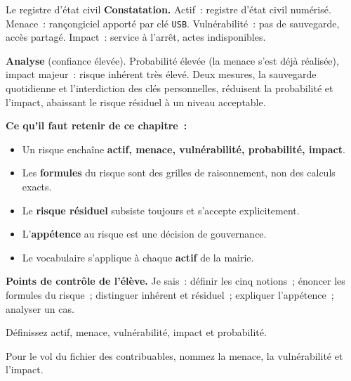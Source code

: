 \begin{boxobjet}{Le registre d'état civil}
\textbf{Constatation.} Actif~: registre d'état civil numérisé. Menace~:
rançongiciel apporté par clé \texttt{USB}. Vulnérabilité~: pas de sauvegarde,
accès partagé. Impact~: service à l'arrêt, actes indisponibles.

\medskip
\textbf{Analyse} (confiance élevée). Probabilité élevée (la menace s'est déjà
réalisée), impact majeur~: risque inhérent très élevé. Deux mesures,
la sauvegarde quotidienne et l'interdiction des clés personnelles, réduisent la
probabilité et l'impact, abaissant le risque résiduel à un niveau acceptable.
\end{boxobjet}

\separateur

\begin{boxresume}
\textbf{Ce qu'il faut retenir de ce chapitre~:}
\begin{itemize}
    \item Un risque enchaîne \textbf{actif, menace, vulnérabilité,
          probabilité, impact}.
    \item Les \textbf{formules} du risque sont des grilles de raisonnement, non
          des calculs exacts.
    \item Le \textbf{risque résiduel} subsiste toujours et s'accepte
          explicitement.
    \item L'\textbf{appétence} au risque est une décision de gouvernance.
    \item Le vocabulaire s'applique à chaque \textbf{actif} de la mairie.
\end{itemize}
\end{boxresume}

\begin{boxinfo}
\textbf{Points de contrôle de l'élève.} Je sais~: définir les cinq notions~;
énoncer les formules du risque~; distinguer inhérent et résiduel~; expliquer
l'appétence~; analyser un cas.
\end{boxinfo}

\bigskip

\begin{boxexo}[title={\ding{45}\quad Exercice~11.1. Les cinq notions \niveaubase}]
Définissez actif, menace, vulnérabilité, impact et probabilité.
\end{boxexo}

\begin{boxexo}[title={\ding{45}\quad Exercice~11.2. La chaîne \niveaubase}]
Pour le vol du fichier des contribuables, nommez la menace, la vulnérabilité et
l'impact.
\end{boxexo}

